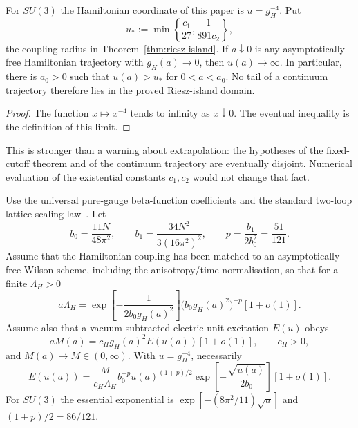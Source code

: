 
\begin{proposition}
\label{prop:g19-axis}
For $SU(3)$ the Hamiltonian coordinate of this paper is
$u=g_H^{-4}$.  Put
\[
 u_*:=\min\left\{\frac{c_1}{27},\frac{1}{891c_2}\right\},
\]
the coupling radius in Theorem~\ref{thm:riesz-island}.  If $a\downarrow0$ is
any asymptotically-free Hamiltonian trajectory with $g_H(a)\to0$, then
$u(a)\to\infty$.  In particular, there is $a_0>0$ such that
$u(a)>u_*$ for $0<a<a_0$.  No tail of a continuum trajectory therefore lies
in the proved Riesz-island domain.
\end{proposition}

\begin{proof}
The function $x\mapsto x^{-4}$ tends to infinity as $x\downarrow0$.
The eventual inequality is the definition of this limit.
\end{proof}

This is stronger than a warning about extrapolation: the hypotheses of the
fixed-cutoff theorem and of the continuum trajectory are eventually disjoint.
Numerical evaluation of the existential constants $c_1,c_2$ would not change
that fact.

\begin{conditional}
\label{cond:g19-scaling}
Use the universal pure-gauge beta-function coefficients and the standard
two-loop lattice scaling law~\cite{GrossWilczek1973,Politzer1973,LuscherWeisz1995}.
Let
\[
 b_0=\frac{11N}{48\pi^2},\qquad
 b_1=\frac{34N^2}{3(16\pi^2)^2},\qquad
 p=\frac{b_1}{2b_0^2}=\frac{51}{121}.
\]
Assume that the Hamiltonian coupling has been matched to an
asymptotically-free Wilson scheme, including the anisotropy/time
normalisation, so that for a finite $\Lambda_H>0$
\begin{equation}\label{eq:g19-asymptotic-scaling}
 a\Lambda_H=
 \exp\!\left[-\frac{1}{2b_0g_H(a)^2}\right]
 \bigl(b_0g_H(a)^2\bigr)^{-p}[1+o(1)].
\end{equation}
Assume also that a vacuum-subtracted electric-unit excitation $E(u)$ obeys
\begin{equation}\label{eq:g19-hamiltonian-normalisation}
 aM(a)=c_Hg_H(a)^2E(u(a))[1+o(1)],\qquad c_H>0,
\end{equation}
and $M(a)\to M\in(0,\infty)$.  With $u=g_H^{-4}$, necessarily
\begin{equation}\label{eq:g19-necessary-law}
 E(u(a))=
 \frac{M}{c_H\Lambda_H}b_0^{-p}
 u(a)^{(1+p)/2}
 \exp\!\left[-\frac{\sqrt{u(a)}}{2b_0}\right][1+o(1)].
\end{equation}
For $SU(3)$ the essential exponential is
$\exp[-(8\pi^2/11)\sqrt u]$ and $(1+p)/2=86/121$.
\end{conditional}

